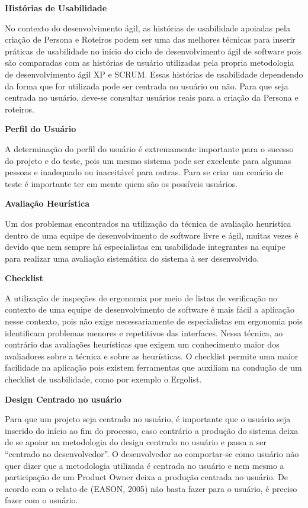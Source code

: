 	\textbf{Histórias de Usabilidade}

	No contexto do desenvolvimento ágil, as histórias de usabilidade apoiadas pela criação de Persona e Roteiros podem ser uma das melhores técnicas para inserir práticas de usabilidade no inicio do ciclo de desenvolvimento ágil de software pois são comparadas com as histórias de usuário utilizadas pela propria metodologia de desenvolvimento ágil XP e SCRUM. Essas histórias de usabilidade dependendo da forma que for utilizada pode ser centrada no usuário ou não. Para que seja centrada no usuário, deve-se consultar usuários reais para a criação da Persona e roteiros.

	\textbf{Perfil do Usuário}

	A determinação do perfil do usuário é extremamente importante para o sucesso do projeto e do teste, pois um mesmo sistema pode ser excelente para algumas pessoas e 
inadequado ou inaceitável para outras. Para se criar um cenário de teste é importante ter em mente quem são os possíveis usuários.

	\textbf{Avaliação Heurística}
	
	Um dos problemas encontrados na utilização da técnica de avaliação heurística dentro de uma equipe de desenvolvimento de software livre e ágil, muitas vezes é devido que nem sempre há especialistas em usabilidade integrantes na equipe para realizar uma avaliação sistemática do sistema à ser desenvolvido.
	
	\textbf{Checklist}
	
	A utilização de inspeções de ergonomia por meio de listas de verificação no contexto de uma equipe de desenvolvimento de software é mais fácil a aplicação nesse contexto, pois não exige necessariamente de especialistas em ergonomia pois identificam problemas menores e repetitivos das interfaces.
	Nessa técnica, ao contrário das avaliações heurísticas que exigem um conhecimento maior dos avaliadores sobre a técnica e sobre as heurísticas. O checklist permite uma maior facilidade na aplicação pois existem ferramentas que auxiliam na condução de um checklist de usabilidade, como por exemplo o Ergolist.

	\textbf{Design Centrado no usuário}
	
	Para que um projeto seja centrado no usuário, é importante que o usuário seja inserido do início ao fim do processo, caso contrário a produção do sistema deixa de se apoiar na metodologia do design centrado no usuário e passa a ser “centrado no desenvolvedor”. O desenvolvedor ao comportar-se como usuário não quer dizer que a metodologia utilizada é centrada no usuário e nem mesmo a participação de um Product Owner deixa a produção centrada no usuário. De acordo com o relato de (EASON, 2005) não basta fazer para o usuário, é preciso fazer com o usuário. 

